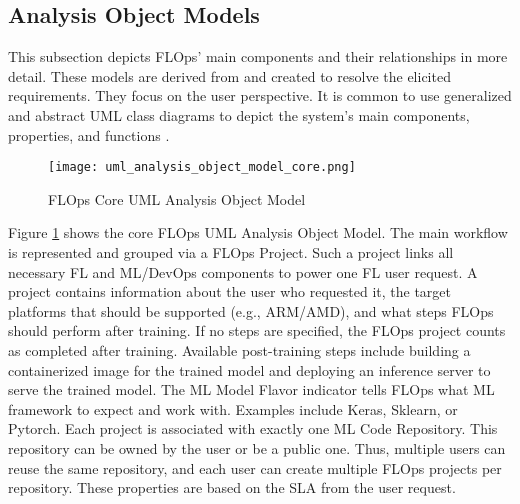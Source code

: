 \subsection{Analysis Object Models}

This subsection depicts FLOps' main components and their relationships in more detail.
These models are derived from and created to resolve the elicited requirements.
They focus on the user perspective.
It is common to use generalized and abstract UML class diagrams to depict the system's main components, properties, and functions \cite{book:bruegge}.

\begin{figure}[h]
    \centering
    \texttt{[image: uml\_analysis\_object\_model\_core.png]}
    \caption{FLOps Core UML Analysis Object Model}
    \label{fig:uml_core_analysis_object_model}
\end{figure}

Figure \ref{fig:uml_core_analysis_object_model} shows the core FLOps UML Analysis Object Model.
The main workflow is represented and grouped via a FLOps Project.
Such a project links all necessary FL and ML/DevOps components to power one FL user request.
A project contains information about the user who requested it, the target platforms that should be supported (e.g., ARM/AMD), and what steps FLOps should perform after training.
If no steps are specified, the FLOps project counts as completed after training.
Available post-training steps include building a containerized image for the trained model and deploying an inference server to serve the trained model.
The ML Model Flavor indicator tells FLOps what ML framework to expect and work with.
Examples include Keras, Sklearn, or Pytorch.
Each project is associated with exactly one ML Code Repository.
This repository can be owned by the user or be a public one.
Thus, multiple users can reuse the same repository, and each user can create multiple FLOps projects per repository.
These properties are based on the SLA from the user request.

